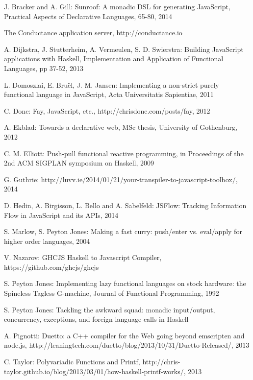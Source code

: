 \documentclass[preprint]{sigplanconf}
\begin{document}
\begin{thebibliography}{}
\softraggedright

J. Bracker and A. Gill: Sunroof: A monadic DSL for generating JavaScript, Practical Aspects of Declarative Languages, 65-80, 2014

The Conductance application server, http://conductance.io

A. Dijkstra, J. Stutterheim, A. Vermeulen, S. D. Swierstra: Building JavaScript applications with Haskell, Implementation and Application of Functional Languages, pp 37-52, 2013

L. Domoszlai, E. Bruël, J. M. Jansen: Implementing a non-strict purely functional language in JavaScript, Acta Universitatis Sapientiae, 2011

C. Done: Fay, JavaScript, etc., http://chrisdone.com/posts/fay, 2012

A. Ekblad: Towards a declarative web, MSc thesis, University of Gothenburg, 2012

C. M. Elliott: Push-pull functional reactive programming, in Proceedings of the 2nd ACM SIGPLAN symposium on Haskell, 2009

G. Guthrie: http://luvv.ie/2014/01/21/your-transpiler-to-javascript-toolbox/, 2014

D. Hedin, A. Birgisson, L. Bello and A. Sabelfeld: JSFlow: Tracking Information Flow in JavaScript and its APIs, 2014

S. Marlow, S. Peyton Jones: Making a fast curry: push/enter vs. eval/apply for higher order languages, 2004

V. Nazarov: GHCJS Haskell to Javascript Compiler, https://github.com/ghcjs/ghcjs

S. Peyton Jones: Implementing lazy functional languages on stock hardware: the Spineless Tagless G-machine, Journal of Functional Programming, 1992

S. Peyton Jones: Tackling the awkward squad: monadic input/output, concurrency, exceptions, and foreign-language calls in Haskell

A. Pignotti: Duetto: a C++ compiler for the Web going beyond emscripten and node.js, http://leaningtech.com/duetto/blog/2013/10/31/Duetto-Released/, 2013

C. Taylor: Polyvariadic Functions and Printf, http://chris-taylor.github.io/blog/2013/03/01/how-haskell-printf-works/, 2013

\end{thebibliography}
\end{document}
